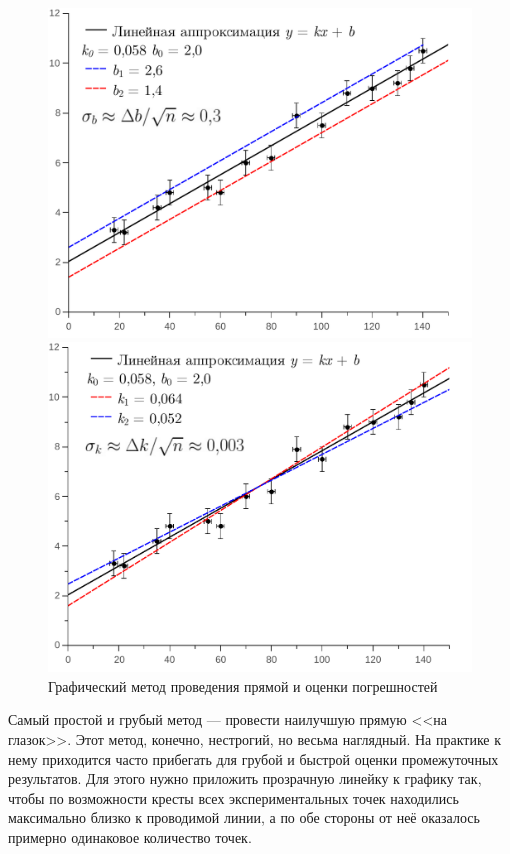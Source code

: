 \documentclass[10pt]{article}
\begin{document}
\begin{figure}[th]
\begin{minipage}[t]{0.5\columnwidth}%
\includegraphics[width=1\linewidth]{images/График1.pdf}%
\end{minipage}%
\begin{minipage}[t]{0.5\columnwidth}%
\includegraphics[width=1\linewidth]{images/График2.pdf}%
\end{minipage}

\caption{Графический метод проведения прямой и оценки погрешностей}
\end{figure}

Самый простой и грубый метод --- провести наилучшую прямую
<<на глазок>>. Этот метод, конечно, нестрогий,
но весьма наглядный. На практике к нему приходится часто прибегать
для грубой и быстрой оценки промежуточных результатов. Для этого нужно
приложить прозрачную линейку к графику так, чтобы по возможности кресты
всех экспериментальных точек находились максимально близко к проводимой
линии, а по обе стороны от неё оказалось примерно одинаковое количество
точек. 
\end{document}
